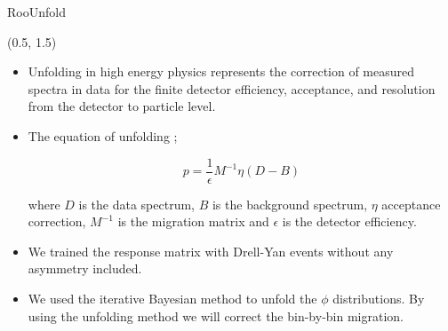 \documentclass[10pt, xcolor={dvipsnames}, aspectratio = 169]{beamer}
\newcommand{\citeme}[1]{{\tiny \footfullcite{#1}}}
\begin{document}
\begin{frame}[fragile]{RooUnfold}

\begin{textblock}{14.0}(0.5, 1.5)

\begin{itemize}

\item Unfolding in high energy physics represents the correction of measured spectra in data for the finite detector
efficiency, acceptance, and resolution from the detector to particle level.

\item The equation of unfolding ;

\begin{equation*}
p = \frac{1}{\epsilon} M^{-1} \eta (D-B)
\end{equation*}

where $D$ is the data spectrum, $B$ is the background spectrum, $\eta$ acceptance correction, $M^{-1}$ is the migration
matrix and $\epsilon$ is the detector efficiency.

%

\item We trained the response matrix with Drell-Yan events without any asymmetry included.
\item We used the iterative Bayesian method to unfold the $\phi$ distributions. \citeme{Wynne:2012jb}
By using the unfolding method we will correct the bin-by-bin migration.

\end{itemize}

\end{textblock}

\end{frame}

\end{document}
